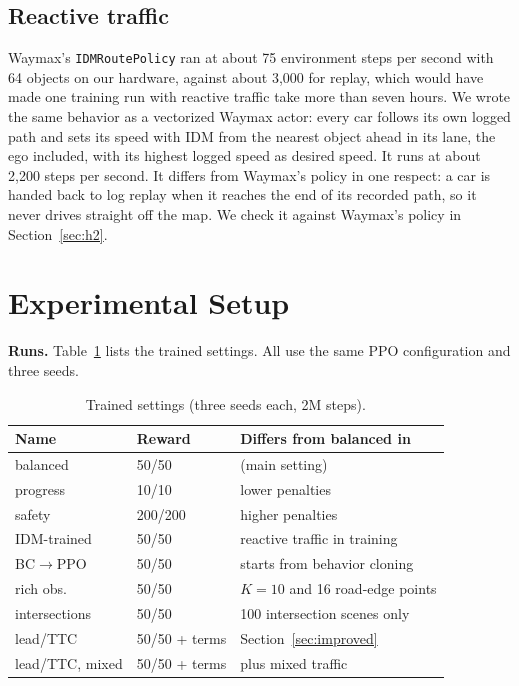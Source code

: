 \documentclass[conference]{IEEEtran}
\begin{document}
\subsection{Reactive traffic}\label{sec:idm}
Waymax's \texttt{IDMRoutePolicy} ran at about 75 environment steps per second with 64
objects on our hardware, against about 3,000 for replay, which would have made one
training run with reactive traffic take more than seven hours. We wrote the same behavior
as a vectorized Waymax actor: every car follows its own logged path and sets its speed
with IDM from the nearest object ahead in its lane, the ego included, with its highest
logged speed as desired speed. It runs at about 2,200 steps per second. It differs from
Waymax's policy in one respect: a car is handed back to log replay when it reaches the
end of its recorded path, so it never drives straight off the map. We check it against
Waymax's policy in Section~\ref{sec:h2}.

\section{Experimental Setup}

\textbf{Runs.} Table~\ref{tab:runs} lists the trained settings. All use the same PPO
configuration and three seeds.

\begin{table}[t]
\caption{Trained settings (three seeds each, 2M steps).}\label{tab:runs}
\centering\small
\setlength{\tabcolsep}{4pt}
\begin{tabular}{@{}lll@{}}
\toprule
Name & Reward & Differs from balanced in \\
\midrule
balanced & 50/50 & (main setting) \\
progress & 10/10 & lower penalties \\
safety & 200/200 & higher penalties \\
IDM-trained & 50/50 & reactive traffic in training \\
BC$\rightarrow$PPO & 50/50 & starts from behavior cloning \\
rich obs. & 50/50 & $K=10$ and 16 road-edge points \\
intersections & 50/50 & 100 intersection scenes only \\
lead/TTC & 50/50 + terms & Section~\ref{sec:improved} \\
lead/TTC, mixed & 50/50 + terms & plus mixed traffic \\
\bottomrule
\end{tabular}
\end{table}
\end{document}
